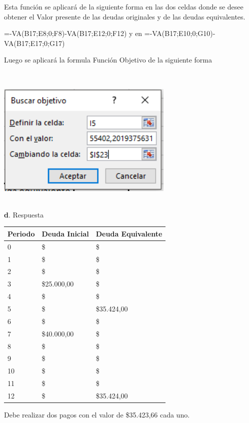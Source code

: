 Esta función se aplicará de la siguiente forma en las dos celdas donde se desee obtener el Valor presente de las deudas originales y de las deudas equivalentes.

\vspace{2mm}

=-VA(B17;E8;0;F8)-VA(B17;E12;0;F12) y en =-VA(B17;E10;0;G10)-VA(B17;E17;0;G17)

\vspace{2mm}

Luego se aplicará la formula Función Objetivo de la siguiente forma

\\
 \begin{center}
	\includegraphics[height=5.4cm]{img/ch8/8_3.png}
\end{center}
\\ 
\textbf{d}. Respuesta

\vspace{2mm}


\begin{spacing}{1.1}
    \begin{center}
        \begin{tabular}{|p{4cm}|p{4cm}|p{4cm}|}
        \hline 
            \textbf{Periodo} & \textbf{Deuda Inicial} & \textbf{Deuda Equivalente} \\ \hline                        

           
            0 & \$  &\$  \\ \hline
            1 & \$ &\$  \\ \hline
            2 & \$ & \$  \\ \hline
            3 & \$25.000,00  & \$ \\ \hline
            4 & \$  &\$  \\ \hline
            5 & \$ &\$35.424,00  \\ \hline
            6 & \$ & \$ \\ \hline
            7 & \$40.000,00  & \$ \\ \hline
            8 & \$&\$   \\ \hline
            9 & \$ &\$  \\ \hline
            10 & \$ & \$ \\ \hline
            11 & \$  & \$ \\ \hline
            12 & \$  & \$35.424,00 \\ \hline    

 
\end{tabular}
\end{center}
\end{spacing}
Debe realizar dos pagos con el valor de \$35.423,66 cada uno.
\vspace{2mm}

